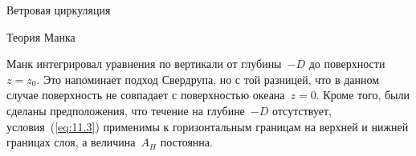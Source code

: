 \begin{chapter}{Ветровая циркуляция}
\begin{section}{Теория Манка}
%

Манк интегрировал уравнения по вертикали от глубины~$-D$ до 
поверхности~$z = z_0$. Это напоминает подход Свердрупа, но с той разницей,
что в данном случае поверхность не совпадает с поверхностью океана~$z = 0$. 
Кроме того, были сделаны предположения, что течение на глубине~$-D$ отсутствует, 
условия~(\ref{eq:11.3}) применимы к горизонтальным границам на верхней и нижней
границах слоя, а величина~$A_H$ постоянна.
%


\end{section}
\end{chapter}
